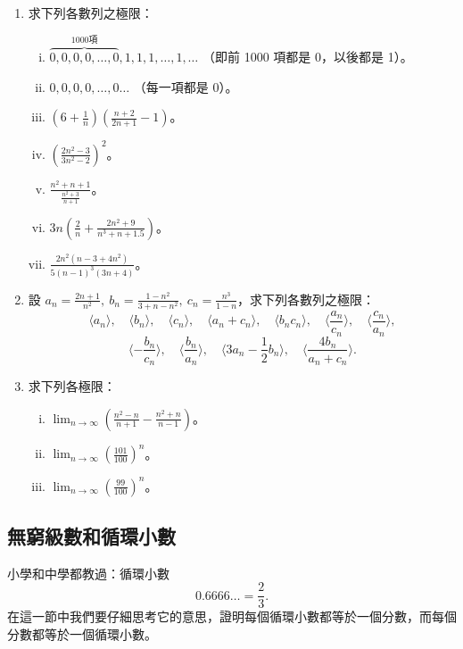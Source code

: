 \begin{enumerate}
    \item 求下列各數列之極限：
    \begin{enumerate}[(i)]
        \item $\overbrace{0, 0, 0, 0, \dots, 0}^{1000\text{項}}, 1, 1, 1, \dots, 1, \dots$ （即前 1000 項都是 0，以後都是 1）。
        \item $0, 0, 0, 0, \dots, 0\dots$ （每一項都是 0）。
        \item $(6+\frac{1}{n})(\frac{n+2}{2n+1}-1)$。
        \item $(\frac{2n^2-3}{3n^2-2})^2$。
        \item $\frac{n^2+n+1}{\frac{n^2+3}{n+1}}$。
        \item $3n(\frac{2}{n}+\frac{2n^2+9}{n^3+n+1.5})$。
        \item $\frac{2n^2(n-3+4n^2)}{5(n-1)^3(3n+4)}$。
    \end{enumerate}

    \item 設 $a_n = \frac{2n+1}{n^2},\ b_n = \frac{1-n^2}{3+n-n^2},\ c_n = \frac{n^3}{1-n}$，求下列各數列之極限：
    \[
    \langle a_n \rangle,\quad \langle b_n \rangle,\quad \langle c_n \rangle,\quad \langle a_n+c_n \rangle,\quad \langle b_n c_n \rangle,\quad \langle \frac{a_n}{c_n} \rangle,\quad \langle \frac{c_n}{a_n} \rangle,
    \]
    \[
    \langle -\frac{b_n}{c_n} \rangle,\quad \langle \frac{b_n}{a_n} \rangle,\quad \langle 3a_n - \frac{1}{2}b_n \rangle,\quad \langle \frac{4b_n}{a_n+c_n} \rangle.
    \]

    \item 求下列各極限：
    \begin{enumerate}[(i)]
        \item $\lim_{n\to\infty}(\frac{n^2-n}{n+1}-\frac{n^2+n}{n-1})$。
        \item $\lim_{n\to\infty}(\frac{101}{100})^n$。
        \item $\lim_{n\to\infty}(\frac{99}{100})^n$。
    \end{enumerate}
\end{enumerate}

\subsection{無窮級數和循環小數}\label{sec:b2_2-6}

小學和中學都教過：循環小數
\[
0.6666\dots = \frac{2}{3}.
\]
在這一節中我們要仔細思考它的意思，證明每個循環小數都等於一個分數，而每個分數都等於一個循環小數。

